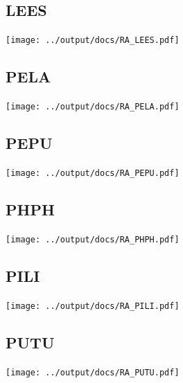 \documentclass[10pt]{book} %
\begin{document}
\clearpage
\newpage
\subsection{LEES}
\texttt{[image: ../output/docs/RA\_LEES.pdf]}

\clearpage
\newpage
\subsection{PELA}
\texttt{[image: ../output/docs/RA\_PELA.pdf]}

\clearpage
\newpage
\subsection{PEPU}
\texttt{[image: ../output/docs/RA\_PEPU.pdf]}

\clearpage
\newpage
\subsection{PHPH}
\texttt{[image: ../output/docs/RA\_PHPH.pdf]}

\clearpage
\newpage
\subsection{PILI}
\texttt{[image: ../output/docs/RA\_PILI.pdf]}

\clearpage
\newpage
\subsection{PUTU}
\texttt{[image: ../output/docs/RA\_PUTU.pdf]}
\end{document}
